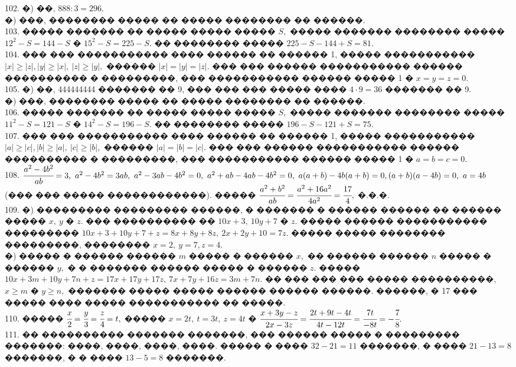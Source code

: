 \documentclass[12pt]{article}
\begin{document}
102. �) ��, $888:3=296.$\\
�) ���, �������� ����� �� ����� �������� �� ������.\\
103. ����� ������� �� ����� ����� ����� $S,$ ����� ������� �������� ����� $12^2-S=144-S$ � $15^2-S=225-S.$ �� �������� ����� $225-S-144+S=81.$\\
104. ��� ��� ����������� ���� ������ �� ������ 1, ����� ����������� $|x|\geqslant |z|, |y|\geqslant |x|,\ |z|\geqslant |y|,$ ������
$|x|=|y|=|z|.$ ��� ��� ������ ����������� ������ ���������� � ���������, ��� ����������� ������ ����� 1 � $x=y=z=0.$\\
105. �) ��, 444444444 ������� �� 9, ��� ��� ��� ����� ���� $4\cdot9=36$ ������� �� 9.\\
�) ���, �������� ����� �� ����� �������� �� ������.\\
106. ����� ������� �� ����� ����� ����� $S,$ ����� ������� �������� ����� $11^2-S=121-S$ � $14^2-S=196-S.$ �� �������� ����� $196-S-121+S=75.$\\
107. ��� ��� ����������� ���� ������ �� ������ 1, ����� ����������� $|a|\geqslant |c|, |b|\geqslant |a|,\ |c|\geqslant |b|,$ ������
$|a|=|b|=|c|.$ ��� ��� ������ ����������� ������ ���������� � ���������, ��� ����������� ������ ����� 1 � $a=b=c=0.$\\
108. $\cfrac{a^2-4b^2}{ab}=3,\ a^2-4b^2=3ab,\ a^2-3ab-4b^2=0,\ a^2+ab-4ab-4b^2=0,\ a(a+b)-4b(a+b)=0, (a+b)(a-4b)=0,\ a=4b$ (��� ��� ����� ������������). �����
$\cfrac{a^2+b^2}{ab}=\cfrac{a^2+16a^2}{4a^2}=\cfrac{17}{4},$ �.�.�.\\
109. �) ��������� ��������� ������, � ������� � ������ ������ �� ������ ����� $x,\ y$ � $z.$ ��� ���������� �� $10x+3,\ 10y+7$ � $z.$ ����� ������ ����������� ��������� $10x+3+10y+7+z=8x+8y+8z,\ 2x+2y+10=7z.$ ����� ����� �������� ���������, �������� $x=2,\ y=7, z=4.$\\
�) ����� � ������ ������ $m$ ����� � ������ $x,$ �� ������ ������ $n$ ����� � ������ $y,$ � � ������� ������ ����� � ������ $z.$ �����
$10x+3m+10y+7n+z=17x+17y+17z,\ 7x+7y+16z=3m+7n.$ �� ��� ��� ��� ����� ����������, $x\geqslant m$ � $y\geqslant n,$ ������� ����� ����� ������ ������ ������. ������, � 17 ��� ����� ���� ����� ����������� �� �����.\\
110. ����� $\cfrac{x}{2}=\cfrac{y}{3}=\cfrac{z}{4}=t,$ ����� $x=2t,\ t=3t,\ z=4t$ � $\cfrac{x+3y-z}{2x-3z}=\cfrac{2t+9t-4t}{4t-12t}=\cfrac{7t}{-8t}=-\cfrac{7}{8}.$\\
111. �� ���������� ������� �������, ��� ������ ����� � ��������� �������: ����, ����, ����, ����. ����� � ���� $32-21=11$ �������, � ���� $21-13=8$ �������, � � ���� $13-5=8$ �������.\\
\end{document}
